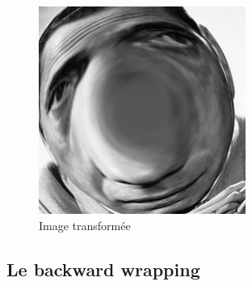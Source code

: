\begin{figure}[!h]
	\centering
	\includegraphics[scale = 0.5]{bogart_tr.png}
	\caption{Image transformée}
\end{figure}

\newpage

	\subsection{Le backward wrapping}
	
